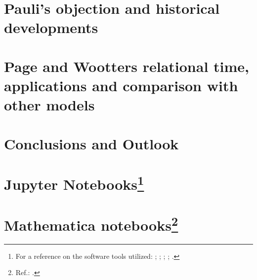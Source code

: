 \chapter{Pauli's objection and historical developments}\label{ch:hist}






\chapter{Page and Wootters relational time, applications and comparison with other models}
  \label{ch:pw}\label{ch:detect}









\chapter{Conclusions and Outlook}\label{ch:outlook}




\appendix

\chapter[Jupyter Notebooks]{Jupyter Notebooks\footnote{
  For a reference on the software tools utilized:
  \cite{comp:scipy};
  \cite{comp:sympy};
  \cite{comp:jupyter};
  \cite{comp:matplotlib};
  \cite{comp:numpy}.
}}






\chapter[Mathematica notebooks]{Mathematica notebooks\footnote{
  Ref.: \cite{Wolfram}.
}}



\printbibliography[heading=bibintoc]



